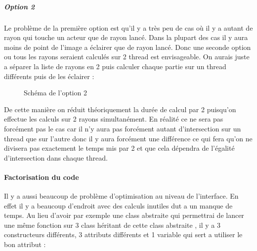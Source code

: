 \documentclass[12pt]{article}
\begin{document}
					\subparagraph{Option 2}
					Le problème de la première option est qu'il y a très peu de cas où il y a autant de rayon qui touche un acteur que de rayon lancé. Dans la plupart des cas il y aura moins de point de l'image a éclairer que de rayon lancé. Donc une seconde option ou tous les rayons seraient calculés sur 2 thread est envisageable. On aurais juste a séparer la liste de rayons en 2 puis calculer chaque partie sur un thread différents puis de les éclairer :
			\begin{center}
					\begin{figure}[!hbtp]
  						\caption{Schéma de l'option 2}
  						\label{fig:option2}
					\end{figure}
					\end{center}
				
					De cette manière on réduit théoriquement la durée de calcul par 2 puisqu'on effectue les calculs sur 2 rayons simultanément. En réalité ce ne sera pas forcément pas le cas car il n'y aura pas forcément autant d'intersection sur un thread que sur l'autre donc il y aura forcément une différence ce qui fera qu'on ne divisera pas exactement le temps mis par 2 et que cela dépendra de l'égalité d'intersection dans chaque thread.
				
				\paragraph{Factorisation du code}
				Il y a aussi beaucoup de problème d'optimisation au niveau de l'interface. En effet il y a beaucoup d'endroit avec des calculs inutiles dut a un manque de temps. Au lieu d'avoir par exemple une class abstraite qui permettrai de lancer une même fonction sur 3 class héritant de cette class abstraite , il y a 3 constructeurs différents, 3 attributs différents et 1 variable qui sert a utiliser le bon attribut :
			
\end{document}

